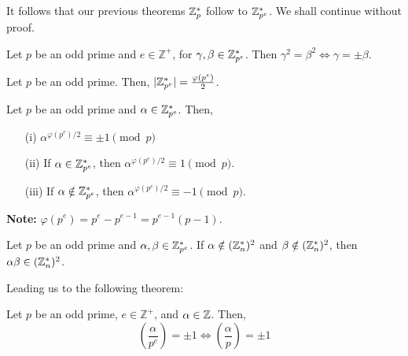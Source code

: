\newpage

\noindent
It follows that our previous theorems $\mathbb{Z}_p^*$ follow to $\mathbb{Z}_{p^{e}}^*$. We shall continue without proof.
\begin{theo}
    
    Let $p$ be an odd prime and $e\in\mathbb{Z}^+$, for $\gamma,\beta\in\mathbb{Z}_{p^{e}}^*$. Then $\gamma^2=\beta^2\Longleftrightarrow\gamma=\pm\beta$.
    
\end{theo}

\begin{theo}

    \label{theo:cardinality_peres}

Let $p$ be an odd prime. Then, $|\mathbb{Z}_{p^{e}}^*|=\frac{\varphi(p^e)}{2}$.
\end{theo}

\begin{theo}

\label{theo:euler_criterion_peres}
Let $p$ be an odd prime and $\alpha\in\mathbb{Z}_{p^{e}}^*$. Then,
\begin{enumerate}
    \item[(i)] $\alpha^{\varphi(p^e)/2} \equiv \pm1 \pmod{p}$
    \item[(ii)] If $\alpha\in\mathbb{Z}_{p^{e}}^*$, then $\alpha^{\varphi(p^e)/2}\equiv 1\pmod{p}$.
    \item[(iii)] If $\alpha\notin\mathbb{Z}_{p^{e}}^*$, then $\alpha^{\varphi(p^e)/2}\equiv -1\pmod{p}$.
\end{enumerate}
\noindent
\textbf{Note:} $\varphi(p^e)=p^e-p^{e-1}=p^{e-1}(p-1)$.
\end{theo}

\begin{theo}

    Let \( p \) be an odd prime and \( \alpha, \beta \in \mathbb{Z}_{p^{e}}^* \). 
If \( \alpha \notin (\mathbb{Z}_n^*)^2 \) and \( \beta \notin (\mathbb{Z}_n^*)^2 \), 
then \( \alpha\beta \in (\mathbb{Z}_n^*)^2 \).
\end{theo}
\noindent

\noindent
Leading us to the following theorem:
\begin{theo}

    Let $p$ be an odd prime, $e\in\mathbb{Z^+}$, and $\alpha\in\mathbb{Z}$. Then,
    \Large 
    \[
     \left(\frac{\alpha}{p^e}\right)=\pm1\Longleftrightarrow\left(\frac{\alpha}{p}\right)=\pm1
    \]
    \normalsize
\end{theo}

